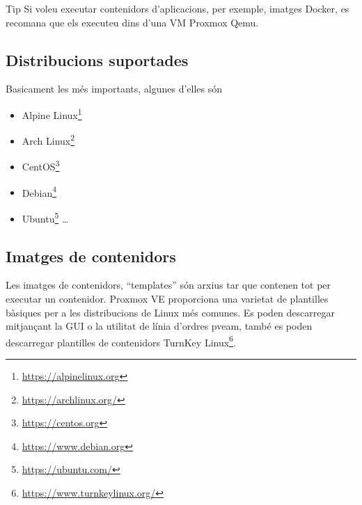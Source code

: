 \documentclass[
  10pt,
]{krantz}
\DeclareRobustCommand{\href}[2]{#2\footnote{\url{#1}}}
\providecommand{\tightlist}{%
  \setlength{\itemsep}{0pt}\setlength{\parskip}{0pt}}
\begin{document}
\begin{rmdtip}{Tip}
Si voleu executar contenidors d'aplicacions, per exemple, imatges Docker, es recomana que els executeu dins d'una VM Proxmox Qemu.

\end{rmdtip}

\hypertarget{distribucions-suportades}{%
\subsection{Distribucions suportades}\label{distribucions-suportades}}

Basicament les més importants, algunes d'elles són

\begin{itemize}
\tightlist
\item
  \href{https://alpinelinux.org}{Alpine Linux}
\item
  \href{https://archlinux.org/}{Arch Linux}
\item
  \href{https://centos.org}{CentOS}
\item
  \href{https://www.debian.org}{Debian}
\item
  \href{https://ubuntu.com/}{Ubuntu} \ldots{}
\end{itemize}

\hypertarget{imatges-de-contenidors}{%
\subsection{Imatges de contenidors}\label{imatges-de-contenidors}}

Les imatges de contenidors, ``templates'' són arxius tar que contenen tot per executar un contenidor. Proxmox VE proporciona una varietat de plantilles bàsiques per a les distribucions de Linux més comunes. Es poden descarregar mitjançant la GUI o la utilitat de línia d'ordres pveam, també es poden descarregar plantilles de contenidors \href{https://www.turnkeylinux.org/}{TurnKey Linux}.
\end{document}

